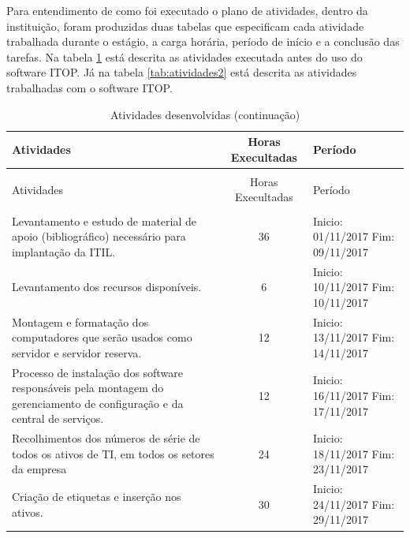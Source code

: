 \documentclass[eso]{bcc}
\begin{document}
Para  entendimento de como foi executado o plano de atividades, dentro da instituição, foram produzidas duas tabelas que especificam cada atividade trabalhada durante o estágio, a carga horária, período de início e a conclusão das tarefas. Na tabela \ref{tab:atividades1} está descrita as atividades executada antes do uso do software ITOP.  Já na tabela \ref{tab:atividades2} está descrita as atividades trabalhadas com o software ITOP.
%
%
%

\begin{longtable}[c]{p{4.7cm}cp{2.5cm}}
  \caption{Atividades desenvolvidas\label{tab:atividades1}} \\
  \hline
  Atividades & Horas Execultadas & Período \\
  \hline\hline
  \endfirsthead
  \caption[]{Atividades desenvolvidas (continuação)} \\
  \hline
  Atividades & Horas Execultadas & Período \\
  \hline\hline
  \endhead
  \hline\hline
  \endlastfoot
  \hline
  \multicolumn{3}{r}{\footnotesize{}continua na próxima página} \\
  \endfoot
\hline
Levantamento e estudo de material de apoio
(bibliográfico) necessário para implantação da ITIL. & 36 & Inicio: 01/11/2017 Fim: 09/11/2017\\
\hline
Levantamento dos recursos disponíveis. & 6 & Inicio: 10/11/2017
Fim: 10/11/2017\\
\hline
Montagem e formatação dos computadores que serão usados como servidor e servidor reserva. & 12 & Inicio: 13/11/2017
Fim: 14/11/2017\\
\hline
Processo de instalação dos software responsáveis pela montagem do gerenciamento de configuração e da central de serviços. & 12 & Inicio: 16/11/2017
Fim: 17/11/2017\\
\hline
Recolhimentos dos números de série de todos os ativos de TI, em todos os setores da empresa & 24 & Inicio: 18/11/2017
Fim: 23/11/2017\\
\hline
Criação de etiquetas e inserção nos ativos.  & 30 & Inicio: 24/11/2017
Fim: 29/11/2017\\
\hline
  
 \end{longtable}
\end{document}
